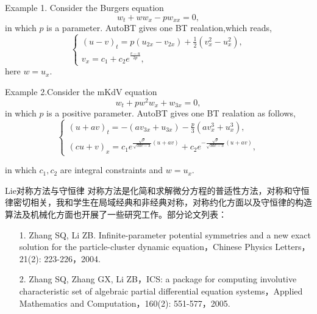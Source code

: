 \documentclass{beamer}
\begin{document}
\begin{frame}
Example 1. Consider the Burgers equation
\begin{equation}
w_t + ww_x - pw_{xx}=0,
\end{equation}
in which $p$ is a parameter. AutoBT gives one BT realation,which reads,
\begin{equation}\label{Burgers_BT}
\left \{
\begin{array}{ll}
(u-v)_t=p(u_{2x}-v_{2x})+\frac{1}{2}(v_x^2-u_x^2), \\[2mm]
v_x=c_1+c_2e^{\frac{v-u}{2p}},
\end{array}
\right.
\end{equation}
here $w=u_x$.
\end{frame}

\begin{frame}
Example 2.Consider the mKdV equation
\begin{equation}
w_t + pw^2w_x+w_{3x}=0,
\end{equation}
in which $p$ is a positive parameter. AutoBT gives one BT realation as follows,
\begin{equation}\label{Burgers_BT}
\left \{
\begin{array}{ll}
(u+av)_t=-(av_{3x}+u_{3x})-\frac{p}{3}(av_x^3+u_x^3), \\[2mm]
(cu+v)_x=c_1e^{\frac{\sqrt{p}}{\sqrt{3ac-3}}(u+av)}+c_2e^{-\frac{\sqrt{p}}{\sqrt{3ac-3}}(u+av)},
\end{array}
\right.
\end{equation}

in which $c_1,c_2$ are integral constraints and $w=u_x$.
\end{frame}

\begin{frame}{Lie对称方法与守恒律}
 对称方法是化简和求解微分方程的普适性方法，对称和守恒律密切相关，我和学生在局域经典和非经典对称，对称约化方面以及守恒律的构造算法及机械化方面也开展了一些研究工作。部分论文列表：
 \begin{itemize}
  \item[1.] Zhang SQ, Li ZB. Infinite-parameter potential symmetries and a new exact solution for the particle-cluster dynamic equation，Chinese Physics Letters，21(2): 223-226，2004.
  \item[2.] Zhang SQ, Zhang GX, Li ZB，ICS: a package for computing involutive characteristic set of algebraic partial differential equation systems，Applied Mathematics and Computation，160(2): 551-577，2005.
 \end{itemize}
\end{frame}
\end{document}
